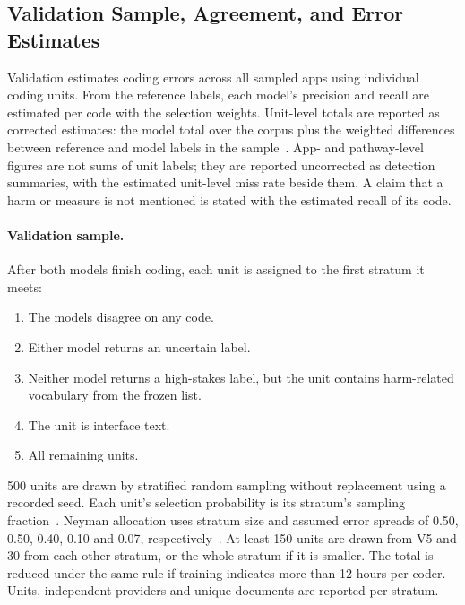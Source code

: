 \subsection{Validation Sample, Agreement, and Error Estimates}
\label{sec:validation}
\label{sec:two-coders}
Validation estimates coding errors across all sampled apps using individual coding units. From
the reference labels, each model's precision and recall are estimated per code with the
selection weights. Unit-level totals are reported as corrected estimates: the model total over
the corpus plus the weighted differences between reference and model labels in the
sample~\parencite[\S4]{egami2023using}. App- and pathway-level figures are not sums of unit
labels; they are reported uncorrected as detection summaries, with the estimated unit-level miss
rate beside them. A claim that a harm or measure is not mentioned is stated with the estimated
recall of its code.

\paragraph{Validation sample.} After both models finish coding, each unit is assigned to the
first stratum it meets:
\begin{enumerate}[label=\textbf{V\arabic*},leftmargin=2.4em,itemsep=0pt,topsep=3pt]
  \item The models disagree on any code.
  \item Either model returns an uncertain label.
  \item Neither model returns a high-stakes label, but the unit contains harm-related vocabulary
    from the frozen list.
  \item The unit is interface text.
  \item All remaining units.
\end{enumerate}
500 units are drawn by stratified random sampling without replacement using a recorded seed.
Each unit's selection probability is its stratum's sampling
fraction~\parencite[chs.~3, 6]{lohr2021sampling}\parencite{egami2023using}. Neyman allocation uses
stratum size and assumed error spreads of 0.50, 0.50, 0.40, 0.10 and 0.07,
respectively~\parencite{fisch2024stratified,gligoric2025unconfident,lohr2021sampling,zrnic2024active}.
At least 150 units are drawn from V5 and 30 from each other stratum, or the whole stratum if it is
smaller. The total is reduced under the same rule if training indicates more than 12 hours per
coder. Units, independent providers and unique documents are reported per stratum.

